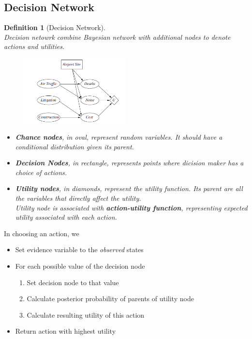 \documentclass[12pt]{article}
\newtheorem{definition}{Definition}[section]
\theoremstyle{definition}
\begin{document}
\subsection{Decision Network}
\begin{definition}[Decision Network]
\hfill\\\normalfont Decision netowrk combine Bayesian network with additional nodes to denote actions and utilities.
\begin{figure}[h]
\centering
\includegraphics[width=0.5\textwidth]{1.png}
\end{figure}
\begin{itemize}
	\item \textbf{Chance nodes}, in oval, represent random variables. It should have a conditional distribution given its parent.
	\item \textbf{Decision Nodes}, in rectangle, represents points where dicision maker has a choice of actions.
	\item \textbf{Utility nodes}, in diamonds, represent the utility function. Its parent are all the variables that directly affect the utility.\\Utility node is associated with \textbf{action-utility function}, representing expected utility associated with each action. 
\end{itemize}
\end{definition}
In choosing an action, we
\begin{itemize}
	\item Set evidence variable to the \textit{observed} states
	\item For each possible value of the decision node
	\begin{enumerate}
		\item Set decision node to that value
		\item Calculate posterior probability of parents of utility node
		\item Calculate resulting utility of this action
	\end{enumerate}
	\item Return action with highest utility
\end{itemize}
\end{document}
